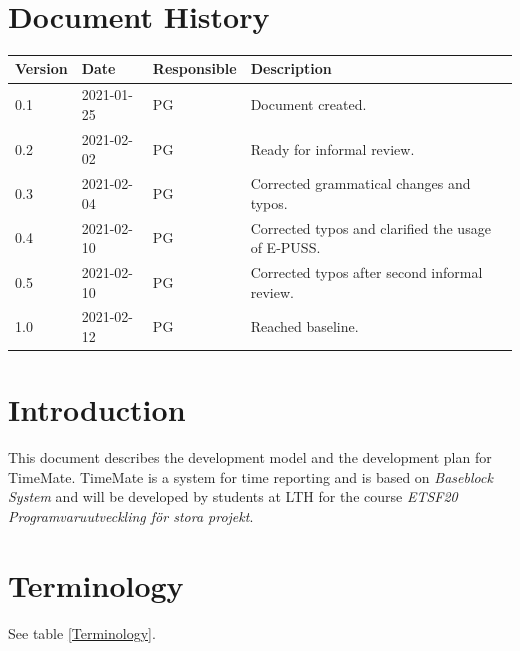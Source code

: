 \documentclass{article}
\date {#1}
\title {
    \documentNumber {00}    %
    \documentVersion {1.0}
    \documentTitle {Software Development Plan}
    \documentGroup {2}
    \documentResponsible {Project Management Group}
    \documentAuthors {Project Management Group}
    \documentDate {2021-02-12}
}
\begin{document}
\maketitle
\thispagestyle{empty}

\newpage

\tableofcontents

\newpage

\section{Document History}
\begin{tabular}{ l | l | l | l }
    Version & Date & Responsible & Description \\
    \hline
    0.1 & 2021-01-25 & PG & Document created. \\
    0.2 & 2021-02-02 & PG & Ready for informal review. \\
    0.3 & 2021-02-04 & PG & Corrected grammatical changes and typos. \\
    0.4 & 2021-02-10 & PG & Corrected typos and clarified the usage of E-PUSS. \\
    0.5 & 2021-02-10 & PG & Corrected typos after second informal review. \\
    1.0 & 2021-02-12 & PG & Reached baseline. \\
\end{tabular}

\section{Introduction}
    This document describes the development model and the development plan for TimeMate.
    TimeMate is a system for time reporting and is based on \textit{Baseblock System} and will be developed by students at LTH for the course
    \textit{ETSF20 Programvaruutveckling för stora projekt}.

\section{Terminology}
    
    See table \ref{Terminology}.
    
\end{document}
